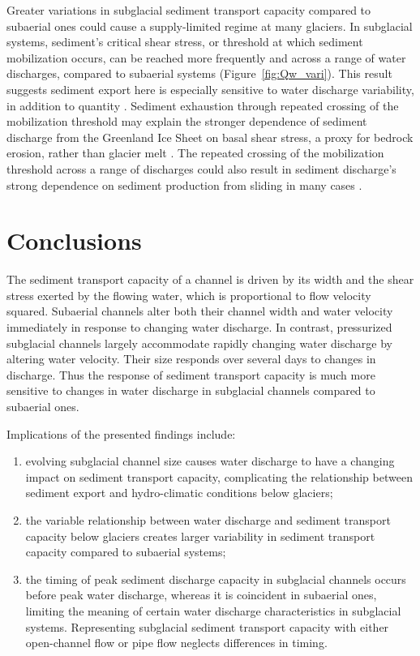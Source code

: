 \documentclass[draft]{agujournal2019}
\begin{document}
Greater variations in subglacial sediment transport capacity compared to subaerial ones could cause a supply-limited regime at many glaciers.
In subglacial systems, sediment's critical shear stress, or threshold at which sediment mobilization occurs, can be reached more frequently and across a range of water discharges, compared to subaerial systems (Figure~\ref{fig:Qw_vari}).
This result suggests sediment export here is especially sensitive to water discharge variability, in addition to quantity \cite{lane2019b}.
Sediment exhaustion through repeated crossing of the mobilization threshold may explain the stronger dependence of sediment discharge from the Greenland Ice Sheet on basal shear stress, a proxy for bedrock erosion, rather than glacier melt \cite{overeem2017}.
The repeated crossing of the mobilization threshold across a range of discharges could also result in sediment discharge's strong dependence on sediment production from sliding in many cases \cite{herman2015,koppes2015}.

\section{Conclusions}

The sediment transport capacity of a channel is driven by its width and the shear stress exerted by the flowing water, which is proportional to  flow velocity squared.
Subaerial channels alter both their channel width and water velocity immediately in response to changing water discharge.
In contrast, pressurized subglacial channels largely accommodate rapidly changing water discharge by altering water velocity.
Their size responds over several days to changes in discharge.
Thus the response of sediment transport capacity is much more sensitive to changes in water discharge in subglacial channels compared to subaerial ones.

Implications of the presented findings include:
\begin{enumerate}
\item  evolving subglacial channel size causes  water discharge to have a changing impact on sediment transport capacity, complicating the relationship between sediment export and hydro-climatic conditions below glaciers;
  \vspace{.1cm}
  
\item the  variable relationship between water discharge and sediment transport capacity below glaciers creates larger variability in sediment transport capacity compared to subaerial systems;
  \vspace{.1cm}

  
\item the timing of peak sediment discharge capacity in subglacial channels occurs before peak  water discharge, whereas it is coincident in subaerial ones, limiting the meaning of certain water discharge characteristics in subglacial systems.
  Representing subglacial sediment transport capacity with either open-channel flow or pipe flow neglects differences in timing.
\end{enumerate}
\end{document}
